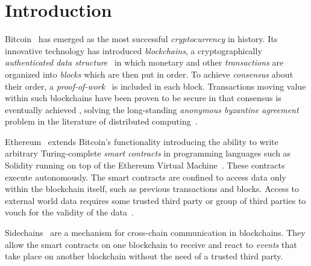 \section{Introduction}

Bitcoin~\cite{bitcoin} has emerged as the most successful \emph{cryptocurrency}
in history. Its innovative technology has introduced \emph{blockchains}, a
cryptographically \emph{authenticated data
structure}~\cite{miller2014authenticated} in which monetary and other
\emph{transactions} are organized into \emph{blocks} which are then put in
order. To achieve \emph{consensus} about their order, a
\emph{proof-of-work}~\cite{C:DwoNao92} is included in each block. Transactions
moving value within such blockchains have been proven to be secure in that
consensus is eventually achieved \cite{EC:GarKiaLeo15}\cite{C:GarKiaLeo17},
solving the long-standing \emph{anonymous byzantine agreement} problem in the
literature of distributed computing~\cite{miller2014anonymous}.

Ethereum~\cite{buterin} extends Bitcoin's functionality introducing the ability
to write arbitrary  Turing-complete \emph{smart contracts} in programming
languages such as Solidity running on top of the Ethereum Virtual
Machine~\cite{wood}. These contracts execute autonomously. The smart contracts
are confined to access data only within the blockchain itself, such as previous
transactions and blocks. Access to external world data requires some trusted
third party or group of third parties to vouch for the validity of the
data~\cite{CCS:ZCCJS16}.

Sidechains~\cite{sidechains} are a mechanism for cross-chain communication in
blockchains. They allow the smart contracts on one blockchain to receive and
react to \textit{events} that take place on another blockchain without the need
of a trusted third party.


